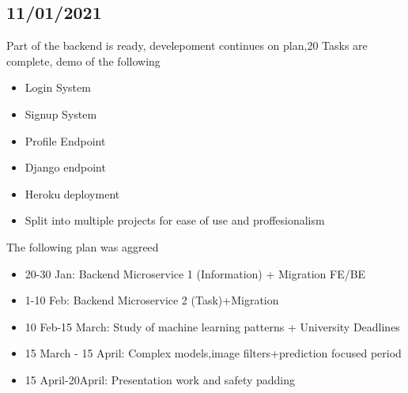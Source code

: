 \documentclass[openany]{article}
\begin{document}
		\subsection{11/01/2021}
			Part of the backend is ready, develepoment continues on plan,20 Tasks are complete, demo of the following
			\begin{itemize}
				\item Login System
				\item Signup System
				\item Profile Endpoint
				\item Django endpoint
				\item Heroku deployment
				\item Split into multiple projects for ease of use and proffesionalism
			\end{itemize}
			The following plan was aggreed
			\begin{itemize}
				\item 20-30 Jan: 				Backend Microservice 1 (Information) + Migration FE/BE
				\item 1-10 Feb:  				Backend Microservice 2 (Task)+Migration
				\item 10 Feb-15 March: 		    Study of machine learning patterns + University Deadlines
				\item 15 March - 15 April:      Complex models,image filters+prediction focused period
				\item 15 April-20April:         Presentation work and safety padding
			\end{itemize}
\end{document}

